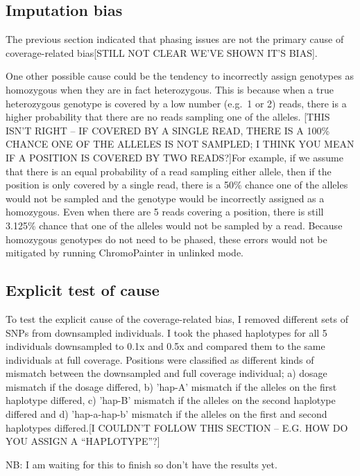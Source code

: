 \subsection{Imputation bias}

The previous section indicated that phasing issues are {\color{red}not} the primary cause of {\color{red}coverage-related bias[STILL NOT CLEAR WE'VE SHOWN IT'S BIAS]}.

One other possible cause could be the tendency to incorrectly assign genotypes as homozygous when they are in fact heterozygous. This is because when a true heterozygous genotype is covered by a low number (e.g.\ 1 or 2) reads, there is a higher probability that there are no reads sampling one of the alleles. {\color{red}[THIS ISN'T RIGHT -- IF COVERED BY A SINGLE READ, THERE IS A 100\% CHANCE ONE OF THE ALLELES IS NOT SAMPLED; I THINK YOU MEAN IF A POSITION IS COVERED BY TWO READS?]For example, if we assume that there is an equal probability of a read sampling either allele, then if the position is only covered by a single read, there is a 50\% chance one of the alleles would not be sampled and the genotype would be incorrectly assigned as a homozygous.} Even when there are 5 reads covering a position, there is still 3.125\% chance that one of the alleles would not be sampled by a read. Because homozygous genotypes do not need to be phased, these errors would not be mitigated by running ChromoPainter in unlinked mode.

\subsection{Explicit test of cause}

To test the explicit cause of the coverage-related bias, I removed different sets of SNPs from downsampled individuals. I took the phased haplotypes for all 5 individuals downsampled to 0.1x and 0.5x and compared them to the same individuals at full coverage. Positions were classified as different kinds of mismatch between the downsampled and full coverage individual; a) dosage mismatch if the dosage differed, b) 'hap-A' mismatch if the alleles on the first haplotype differed, c) 'hap-B' mismatch if the alleles on the second haplotype differed and d) 'hap-a-hap-b' mismatch if the alleles on the first and second haplotypes differed.{\color{red}[I COULDN'T FOLLOW THIS SECTION -- E.G. HOW DO YOU ASSIGN A ``HAPLOTYPE''?]}

NB: I am waiting for this to finish so don't have the results yet.


